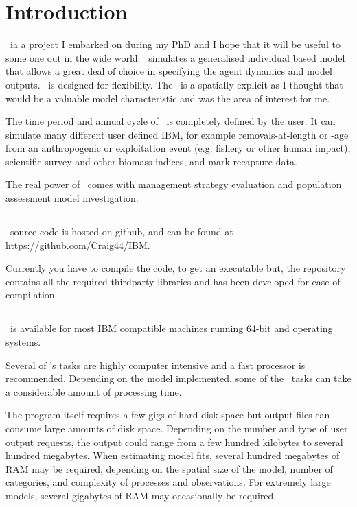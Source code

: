\section{Introduction\label{sec:Introduction}} 

\IBM\ ia a project I embarked on during my PhD and I hope that it will be useful to some one out in the wide world. \IBM\ simulates a generalised individual based model that allows a great deal of choice in specifying the agent dynamics and model outputs. \IBM\ is designed for flexibility. The \IBM\ is a spatially explicit as I thought that would be a valuable model characteristic and was the area of interest for me.

The time period and annual cycle of \IBM\ is completely defined by the user. It can simulate many different user defined IBM, for example removals-at-length or -age from an anthropogenic or exploitation event (e.g. fishery or other human impact), scientific survey and other biomass indices, and mark-recapture data.

The real power of \IBM\ comes with management strategy evaluation and population assessment model investigation.


\subsection{}
\IBM\ source code is hosted on github, and can be found at \url{https://github.com/Craig44/IBM}.

Currently you have to compile the code, to get an executable but, the repository contains all the required thirdparty libraries and has been developed for ease of compilation.

\subsection{}
\IBM\ is available for most IBM compatible machines running 64-bit  and  operating systems.

Several of \IBM 's tasks are highly computer intensive and a fast processor is recommended. Depending on the model implemented, some of the \IBM\ tasks can take a considerable amount of processing time.

The program itself requires a few gigs of hard-disk space but output files can consume large amounts of disk space. Depending on the number and type of user output requests, the output could range from a few hundred kilobytes to several hundred megabytes. When estimating model fits, several hundred megabytes of RAM may be required, depending on the spatial size of the model, number of categories, and complexity of processes and observations. For extremely large models, several gigabytes of RAM may occasionally be required. 

